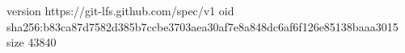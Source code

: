 version https://git-lfs.github.com/spec/v1
oid sha256:b83ca87d7582d385b7ccbe3703aea30af7e8a848dc6af6f126e85138baaa3015
size 43840
